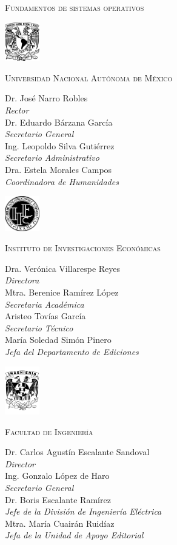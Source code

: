 \pagestyle{empty}
\renewcommand{\thepage}{\arabic{page}}

\textsc{Fundamentos de sistemas operativos}

\eject

\begin{center}
  \includegraphics[width=1.5cm]{unam/logo_unam}

  \textsc{Universidad Nacional Autónoma de México}

  Dr. José Narro Robles\\\textit{Rector}\\
  Dr. Eduardo Bárzana García\\\textit{Secretario General}\\
  Ing. Leopoldo Silva Gutiérrez\\\textit{Secretario Administrativo}\\
  Dra. Estela Morales Campos\\\textit{Coordinadora de Humanidades}

  \vfill
  \includegraphics[width=1.5cm]{unam/logo_iiec}

  \textsc{Instituto de Investigaciones Económicas}

  Dra. Verónica Villarespe Reyes\\\textit{Directora}\\
  Mtra. Berenice Ramírez López\\\textit{Secretaria Académica}\\
  Aristeo Tovías García\\\textit{Secretario Técnico}\\
  María Soledad Simón Pinero\\\textit{Jefa del Departamento de Ediciones}

  \vfill
  \includegraphics[width=1.5cm]{unam/logo_fi}

  \textsc{Facultad de Ingeniería}

  Dr. Carlos Agustín Escalante Sandoval\\\textit{Director}\\
  Ing. Gonzalo López de Haro\\\textit{Secretario General}\\
  Dr. Boris Escalante Ramírez\\\textit{Jefe de la División de
    Ingeniería Eléctrica}\\
  Mtra. María Cuairán Ruidíaz\\\textit{Jefa de la Unidad de Apoyo Editorial}

\end{center}


